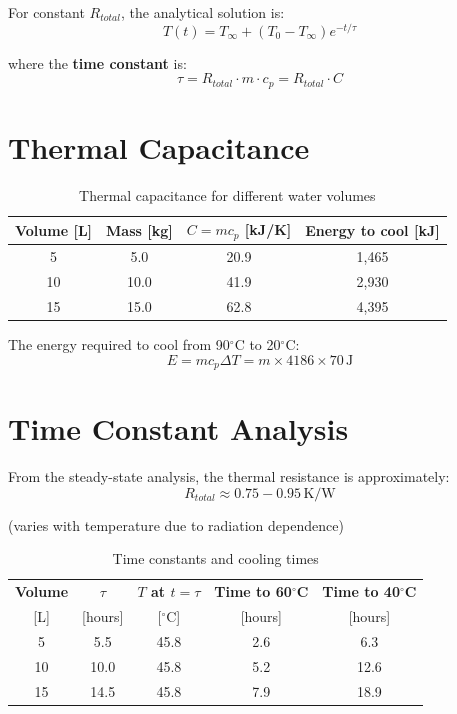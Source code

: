 \documentclass[11pt]{article}
\newcommand{\degC}{$^\circ$C}
\newcommand{\unit}[1]{\,\mathrm{#1}}
\begin{document}
For constant $R_{total}$, the analytical solution is:
\begin{equation}
    T(t) = T_\infty + (T_0 - T_\infty) e^{-t/\tau}
\end{equation}

where the \textbf{time constant} is:
\begin{equation}
    \tau = R_{total} \cdot m \cdot c_p = R_{total} \cdot C
\end{equation}

\section{Thermal Capacitance}

\begin{table}[H]
\centering
\caption{Thermal capacitance for different water volumes}
\begin{tabular}{cccc}
\toprule
\textbf{Volume [L]} & \textbf{Mass [kg]} & \textbf{$C = mc_p$ [kJ/K]} & \textbf{Energy to cool [kJ]} \\
\midrule
5 & 5.0 & 20.9 & 1,465 \\
10 & 10.0 & 41.9 & 2,930 \\
15 & 15.0 & 62.8 & 4,395 \\
\bottomrule
\end{tabular}
\end{table}

The energy required to cool from 90\degC{} to 20\degC:
\begin{equation}
    E = m c_p \Delta T = m \times 4186 \times 70 \unit{J}
\end{equation}

\section{Time Constant Analysis}

From the steady-state analysis, the thermal resistance is approximately:
\begin{equation}
    R_{total} \approx 0.75 - 0.95 \unit{K/W}
\end{equation}

(varies with temperature due to radiation dependence)

\begin{table}[H]
\centering
\caption{Time constants and cooling times}
\begin{tabular}{ccccc}
\toprule
\textbf{Volume} & \textbf{$\tau$} & \textbf{$T$ at $t=\tau$} & \textbf{Time to 60\degC} & \textbf{Time to 40\degC} \\
{[L]} & [hours] & [\degC] & [hours] & [hours] \\
\midrule
5 & 5.5 & 45.8 & 2.6 & 6.3 \\
10 & 10.0 & 45.8 & 5.2 & 12.6 \\
15 & 14.5 & 45.8 & 7.9 & 18.9 \\
\bottomrule
\end{tabular}
\end{table}
\end{document}
